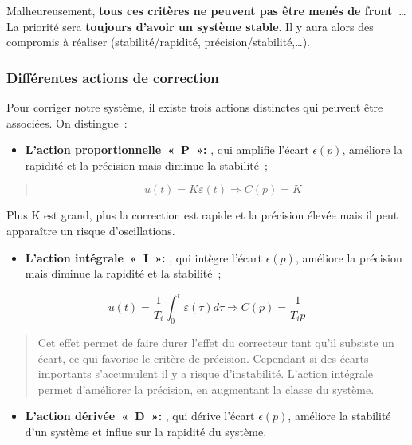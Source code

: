 Malheureusement, \textbf{tous ces critères ne peuvent pas être menés de front~}\ldots{} La priorité sera \textbf{toujours d'avoir un système stable}. Il y aura alors des compromis à réaliser (stabilité/rapidité, précision/stabilité,\ldots).

\hypertarget{diffuxe9rentes-actions-de-correction}{%
\subsubsection{Différentes actions de correction}\label{diffuxe9rentes-actions-de-correction}}

Pour corriger notre système, il existe trois actions distinctes qui peuvent être associées. On distingue~:

\begin{itemize}
\item
  \textbf{L'action proportionnelle~«~P~»:} , qui amplifie l'écart \(\epsilon(p)\), améliore la rapidité et la précision mais diminue la stabilité~;
\end{itemize}

\begin{quote}
\[u(t) = K\varepsilon(t) \Rightarrow \boxed{C(p) = K}\]
\end{quote}

Plus K est grand, plus la correction est rapide et la précision élevée mais il peut apparaître un risque d'oscillations.

\begin{itemize}
\item
  \textbf{L'action intégrale~«~I~»:} , qui intègre l'écart \(\epsilon(p)\), améliore la précision mais diminue la rapidité et la stabilité~;
\end{itemize}

\[u(t) = \frac{1}{T_{i}}\int_{0}^{t}{\varepsilon(\tau)d\tau} \Rightarrow \boxed{C(p) = \frac{1}{T_{i}p}}\]

\begin{quote}
Cet effet permet de faire durer l'effet du correcteur tant qu'il subsiste un écart, ce qui favorise le critère de précision. Cependant si des écarts importants s'accumulent il y a risque d'instabilité. L'action intégrale permet d'améliorer la précision, en augmentant la classe du système.
\end{quote}

\begin{itemize}
\item
  \textbf{L'action dérivée~«~D~»:} , qui dérive l'écart \(\epsilon(p)\), améliore la stabilité d'un système et influe sur la rapidité du système.
\end{itemize}


